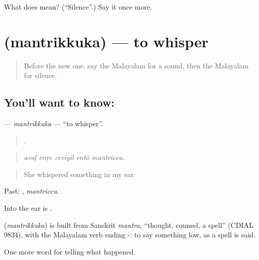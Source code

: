 \begin{tcolorbox}[breakable,colback=teal!4,colframe=teal!35!black,title={Before you move on}]
What does  mean? (\textquotedblleft{}Silence\textquotedblright{}.) Say it once more.
\end{tcolorbox}
\section[\texorpdfstring{\ml{മന്ത്രിക്കുക} (mantrikkuka)}{മന്ത്രിക്കുക (mantrikkuka)}]{ (mantrikkuka) — to whisper}

\label{lesson:ML-C381-mantrikkuka}



\begin{quote}
Before the new one: say the Malayalam for a sound, then the Malayalam for silence.
\end{quote}

\subsection*{You'll want to know: }
\textbf{} — \emph{mantrikkuka} — \textquotedblleft{}to whisper\textquotedblright{}.

\begin{quote}
    .
\end{quote}

\begin{quote}
\emph{avaḷ enṟe ceviyil entō mantriccu.}
\end{quote}

\begin{quote}
She whispered something in my ear.
\end{quote}

Past: , \emph{mantriccu}.

Into the ear is .

\begin{cousinweb}
\textbf{} (\emph{mantrikkuka}) is built from Sanskrit \emph{mantra}, \textquotedblleft{}thought, counsel, a spell\textquotedblright{} (CDIAL 9834), with the Malayalam verb ending -: to say something low, as a spell is said.
\end{cousinweb}

\begin{grammarlens}[title={What you've built}]
One more word for telling what happened.
\end{grammarlens}

